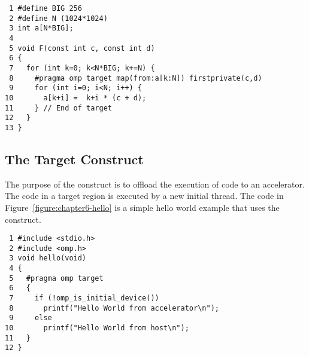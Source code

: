 \begin{figure*}[!tb]
\begin{verbatim}
 1 #define BIG 256
 2 #define N (1024*1024)
 3 int a[N*BIG];
 4 
 5 void F(const int c, const int d)
 6 {
 7   for (int k=0; k<N*BIG; k+=N) {
 8     #pragma omp target map(from:a[k:N]) firstprivate(c,d) 
 9     for (int i=0; i<N; i++) {
10       a[k+i] =  k+i * (c + d);
11     } // End of target
12   }
13 }
\end{verbatim}
\caption{ \textbf {Use array section to map a subset of an array} -- \small
          Map a slice of the array \texttt{a} each time through the loop.
         }
\label{figure:chapter6-mapslice}
\end{figure*}

\subsection{The Target Construct}
\label{sec:06.target-construct}

The purpose of the  construct is to offload the execution of code
to an accelerator.  The code in a target region is executed by a new
initial thread.  
The code in Figure~\ref{figure:chapter6-hello} is a simple 
hello world example that uses the  construct.  

\begin{figure*}[!tbhp]
\begin{verbatim}
 1 #include <stdio.h>
 2 #include <omp.h>
 3 void hello(void)
 4 {
 5   #pragma omp target 
 6   {
 7     if (!omp_is_initial_device())
 8       printf("Hello World from accelerator\n");
 9     else
10       printf("Hello World from host\n");
11   }
12 }
\end{verbatim}
\caption{ \textbf {Example of a target construct } -- \small
          If the initial thread is running on an accelerator, it executes the
          first \texttt{printf()}.
          Otherwise, it is running on the host device and
          executes the second \texttt{printf()}.
          Note that some implementations may not support calling \texttt{printf()} on an accelerator. 
         }
\label{figure:chapter6-hello}
\end{figure*}

